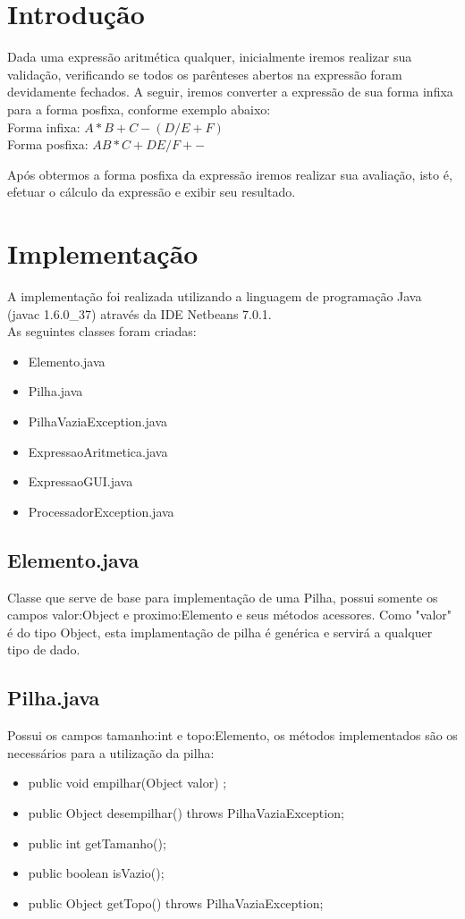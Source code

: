 \documentclass[a4paper,11pt]{article}
\begin{document}
\section{Introdução} 
Dada uma expressão aritmética qualquer, inicialmente iremos realizar sua validação, verificando se todos os parênteses abertos na expressão foram devidamente fechados. A seguir, iremos converter a expressão de sua forma infixa para a forma posfixa, conforme exemplo abaixo:\\
Forma infixa: \(A*B+C-(D/E+F)\)\\
Forma posfixa: \(A B*C+D E/F+-\)

Após obtermos a forma posfixa da expressão iremos realizar sua avaliação, isto é, efetuar o cálculo da expressão e exibir seu resultado.

\section{Implementação}
A implementação foi realizada utilizando a linguagem de programação Java (javac 1.6.0\_37) através da IDE Netbeans 7.0.1.\\
As seguintes classes foram criadas:
\begin{itemize}
  \item Elemento.java
  \item Pilha.java
  \item PilhaVaziaException.java
  \item ExpressaoAritmetica.java
  \item ExpressaoGUI.java
  \item ProcessadorException.java
\end{itemize}

\subsection{Elemento.java}
Classe que serve de base para implementação de uma Pilha, possui somente os campos valor:Object e proximo:Elemento e seus métodos acessores. Como "valor" é do tipo Object, esta implamentação de pilha é genérica e servirá a qualquer tipo de dado.

\subsection{Pilha.java}
Possui os campos tamanho:int e topo:Elemento, os métodos implementados são os necessários para a utilização da pilha: 
\begin{itemize}
  \item public void empilhar(Object valor) ;
  \item public Object desempilhar() throws PilhaVaziaException;
  \item public int getTamanho();
  \item public boolean isVazio();
  \item public Object getTopo() throws PilhaVaziaException;
\end{itemize}
\end{document}
